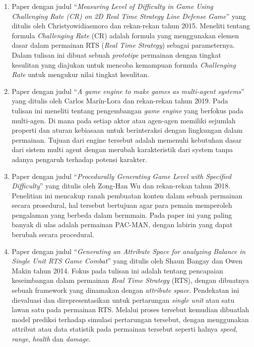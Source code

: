\begin{enumerate}
	\item Paper dengan judul ``\textit{Measuring Level of Difficulty in Game Using Challenging Rate (CR) on 2D Real Time Strategy Line Defense Game}'' yang ditulis oleh Christyowidiasmoro dan rekan-rekan tahun 2015. Meneliti tentang formula \textit{Challenging Rate} (CR) adalah formula yang menggunakan elemen dasar dalam permainan RTS (\textit{Real Time Strategy}) sebagai parameternya. Dalam tulisan ini dibuat sebuah \textit{prototipe} permainan dengan tingkat kesulitan yang diajukan untuk mencoba kemampuan formula \textit{Challenging Rate} untuk mengukur nilai tingkat kesulitan.

	\item Paper dengan judul ``\textit{A game engine to make games as multi-agent systems}'' yang ditulis oleh Carlos Marín-Lora dan rekan-rekan tahun 2019. Pada tulisan ini meneliti tentang pengembangan \textit{game engine} yang berfokus pada multi-agen. Di mana pada setiap aktor atau agen-agen memiliki sejumlah properti dan aturan kebiasaan untuk berinteraksi dengan lingkungan dalam permainan. Tujuan dari engine tersebut adalah memenuhi kebutuhan dasar dari sistem multi agent dengan merubah karakteristik dari system tanpa adanya pengaruh terhadap potensi karakter.

	\item Paper dengan judul ``\textit{Procedurally Generating Game Level with Specified Difficulty}'' yang ditulis oleh Zong-Han Wu dan rekan-rekan tahun 2018. Penelitian ini mencakup ranah pembuatan konten dalam sebuah permainan secara prosedural, hal tersebut bertujuan agar para pemain memperoleh pengalaman yang berbeda dalam bermmain. Pada paper ini yang paling banyak di ulas adalah permainan PAC-MAN, dengan labirin yang dapat berubah secara procedural.
	
	\item Paper dengan judul ``\textit{Generating an Attribute Space for analyzing Balance in Single Unit RTS Game Combat}'' yang ditulis oleh Shaun Bangay dan Owen Makin tahun 2014. Fokus pada tulisan ini adalah tentang pencapaian keseimbangan dalam permainan \textit{Real Time Strategy} (RTS), dengan dibuatnya sebuah framework yang dinamakan dengan \textit{attribute space}. Pendekatan ini dievaluasi dan direpresentasikan untuk pertarungan \textit{single unit} atau satu lawan satu pada permainan RTS. Melalui proses tersebut kemudian dibuatlah model prediksi terhadap simulasi pertarungan tersebut, dengan menggunakan attribut atau data statistik pada permainan tersebut seperti halnya \textit{speed}, \textit{range}, \textit{health} dan \textit{damage}.
\end{enumerate}

